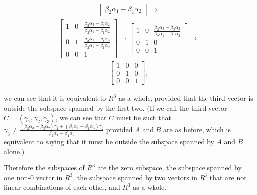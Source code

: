 \documentclass[12pt]{article}
\begin{document}
\begin{enumerate}
\begin{enumerate}
\begin{align*}
\begin{bmatrix}
                                 {\beta_2\alpha_1-\beta_1\alpha_2}
                \end{bmatrix}
                \xrightarrow{}
              \end{align*}
              \begin{align*}
                \begin{bmatrix}
                  1 & 0 & \frac{\beta_2\alpha_3-\beta_3\alpha_2}
                               {\beta_2\alpha_1-\beta_1\alpha_2}\\
                  0 & 1 & \frac{\beta_3\alpha_1 -\beta_1\alpha_3}
                               {\beta_2\alpha_1 - \beta_1\alpha_2}\\
                  0 & 0 & 1
                \end{bmatrix}
                \xrightarrow{}
                \begin{bmatrix}
                  1 & 0 & \frac{\beta_2\alpha_3-\beta_3\alpha_2}
                               {\beta_2\alpha_1-\beta_1\alpha_2}\\
                  0 & 1 & 0\\
                  0 & 0 & 1
                \end{bmatrix}
                \xrightarrow{}
              \end{align*}
              \begin{align*}
                \begin{bmatrix}
                  1 & 0 & 0\\
                  0 & 1 & 0\\
                  0 & 0 & 1
                \end{bmatrix},
              \end{align*}

              we can see that it is equivalent to $R^3$ as a whole, provided that the
              third vector is outside the subspace spanned by the first two. (If we call the
              third vector $C = (\gamma_1,\gamma_2,\gamma_3)$, we can see that $C$
              must be such that $\gamma_3 \neq
              \frac{(\beta_2\alpha_3-\beta_3\alpha_2)\gamma_1 + (\beta_3\alpha_1
              -\beta_1\alpha_3)\gamma_2} {\beta_2\alpha_1-\beta_1\alpha_2}$ provided
              $A$ and $B$ are as before, which is equivalent to saying that it must
              be outside the subspace spanned by $A$ and $B$ alone.)

              Therefore the subspaces of $R^3$ are the zero subspace, the subspace
              spanned by one non-$0$ vector in $R^3$, the subspace spanned by two
              vectors in $R^3$ that are not linear combinations of each other, and
              $R^3$ as a whole.

          \end{enumerate}

  \end{enumerate}
\end{document}
